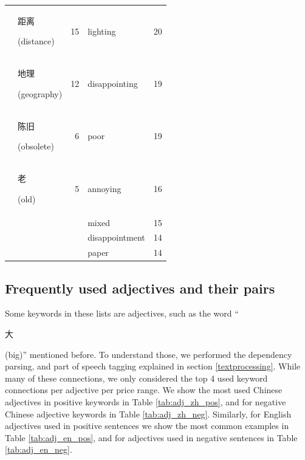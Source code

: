 \documentclass[smallextended,natbib]{svjour3}       %
\begin{document}
\begin{table}[ht]
{\begin{tabular}{|c|lr|lr|}
                                                             & \begin{CJK}{UTF8}{gbsn}距离\end{CJK} (distance)  & 15   & lighting       & 20  \\  
                                                             & \begin{CJK}{UTF8}{gbsn}地理\end{CJK} (geography) & 12   & disappointing  & 19  \\  
                                                             & \begin{CJK}{UTF8}{gbsn}陈旧\end{CJK} (obsolete)  & 6    & poor           & 19  \\  
                                                             & \begin{CJK}{UTF8}{gbsn}老\end{CJK} (old)        & 5    & annoying       & 16  \\  
                                                             &                                                &      & mixed          & 15  \\  
                                                             &                                                &      & disappointment & 14  \\  
                                                             &                                                &      & paper          & 14  \\ \hline
        \end{tabular}%
        }
    \end{table}

  \subsection{Frequently used adjectives and their pairs}\label{adjresults}

    Some keywords in these lists are adjectives, such as the word ``\begin{CJK}{UTF8}{gbsn}大\end{CJK} (big)'' mentioned before. To understand those, we performed the dependency parsing, and part of speech tagging explained in section \ref{textprocessing}. While many of these connections, we only considered the top 4 used keyword connections per adjective per price range. We show the most used Chinese adjectives in positive keywords in Table \ref{tab:adj_zh_pos}, and for negative Chinese adjective keywords in Table \ref{tab:adj_zh_neg}. Similarly, for English adjectives used in positive sentences we show the most common examples in Table \ref{tab:adj_en_pos}, and for adjectives used in negative sentences in Table \ref{tab:adj_en_neg}.
\end{document}
